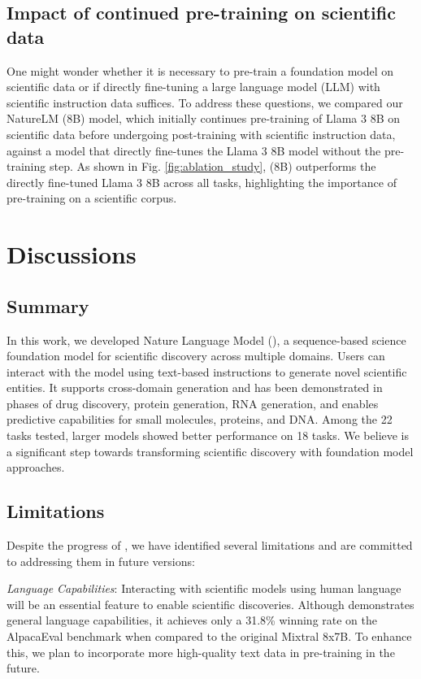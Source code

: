 \subsection{Impact of continued pre-training on scientific data}
One might wonder whether it is necessary to pre-train a foundation model on scientific data or if directly fine-tuning a large language model (LLM) with scientific instruction data suffices. To address these questions, we compared our NatureLM (8B) model, which initially continues pre-training of Llama 3 8B on scientific data before undergoing post-training with scientific instruction data, against a model that directly fine-tunes the Llama 3 8B model without the pre-training step. As shown in Fig. \ref{fig:ablation_study}, \ourM{} (8B) outperforms the directly fine-tuned Llama 3 8B across all tasks, highlighting the importance of pre-training on a scientific corpus.


\section{Discussions}
\subsection{Summary}
In this work, we developed Nature Language Model (\ourM{}), a sequence-based science foundation model for scientific discovery across multiple domains. Users can interact with the model using text-based instructions to generate novel scientific entities. It supports cross-domain generation and has been demonstrated in phases of drug discovery, protein generation, RNA generation, and enables predictive capabilities for small molecules, proteins, and DNA. Among the 22 tasks tested, larger models showed better performance on 18 tasks. We believe \ourM{} is a significant step towards transforming scientific discovery with foundation model approaches. 

\subsection{Limitations}
Despite the progress of \ourM{}, we have identified several limitations and are committed to addressing them in future versions:

{\em Language Capabilities}: Interacting with scientific models using human language will be an essential feature to enable scientific discoveries. Although \ourM{} demonstrates general language capabilities, it achieves only a 31.8\% winning rate on the AlpacaEval benchmark when compared to the original Mixtral 8x7B. To enhance this, we plan to incorporate more high-quality text data in pre-training in the future.


